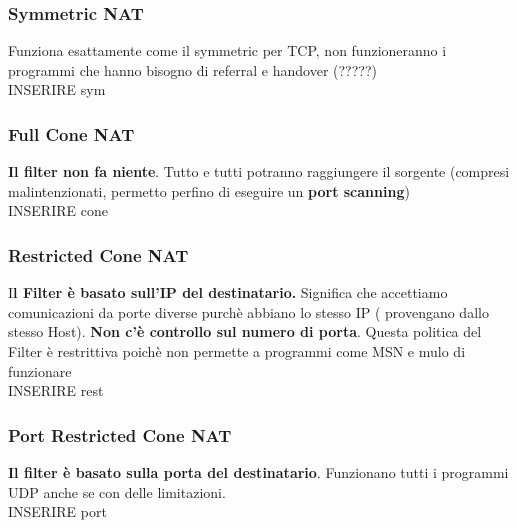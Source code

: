 \documentclass[12pt]{article}
\begin{document}
			\subsubsection{Symmetric NAT}
				Funziona esattamente come il symmetric per TCP, non funzioneranno i programmi che hanno bisogno di referral e handover (?????)\\
				
				INSERIRE sym\\
				
			\subsubsection{Full Cone NAT}
			 	\textbf{Il filter non fa niente}. Tutto e tutti potranno raggiungere  il sorgente (compresi malintenzionati, permetto perfino di eseguire un \textbf{port scanning})\\
			 	
			 	INSERIRE cone\\
			 
			 \subsubsection{Restricted Cone NAT}
			 	I\textbf{l Filter è basato sull'IP del destinatario.} Significa che accettiamo comunicazioni da porte diverse purchè abbiano lo stesso IP ( provengano dallo stesso Host). \textbf{Non c'è controllo sul numero di porta}. Questa politica del Filter è restrittiva poichè non permette a programmi come MSN e mulo di funzionare\\
			 	
			 	INSERIRE rest\\
			 	
			 \subsubsection{Port Restricted Cone NAT}
			 	\textbf{Il filter è basato sulla porta del destinatario}. Funzionano tutti i programmi UDP anche se con delle limitazioni.\\
			 	
			 	INSERIRE port\\
			 	
\end{document}
